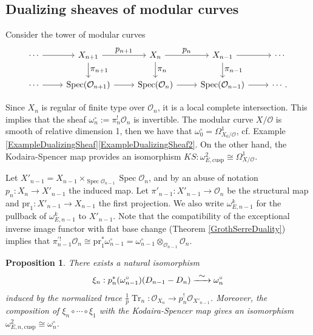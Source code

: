 \documentclass[11pt]{article}
\newcommand{\cf}{cf.\xspace}
\newcommand\To[1]{\mathchoice{\xrightarrow{\textstyle\kern4pt#1\kern3pt}}{\stackrel{#1}{\to}}{}{}}
\let\ts\textstyle
\newcommand{\cusp}{\mathrm{cusp}}
\newcommand{\pr}{\mathrm{pr}}
\numberwithin{equation}{section}
\newtheorem{prop}{Proposition}[section]
\theoremstyle{definition}
\newcommand{\n}[1]{\mathcal{#1}}
\newcommand{\s}[1]{\mathscr{#1}}
\DeclareMathOperator{\Tr}{Tr}
\DeclareMathOperator{\Spec}{Spec}
\begin{document}
\subsection*{Dualizing sheaves of modular curves}

Consider the tower of modular curves
\[
\begin{tikzcd}
\cdots \ar[r] & X_{n+1} \ar[r,"\ts p_{n+1}"] \ar[d, "\ts \pi_{n+1}"]& X_n \ar[r,"\ts p_n"] \ar[d, "\ts \pi_n"]& X_{n-1} \ar[r] \ar[d, "\ts \pi_{n-1}"] & \cdots \\
\cdots \ar[r] & \Spec(\n{O}_{n+1}) \ar[r] & \Spec(\n{O}_{n}) \ar[r] & \Spec(\n{O}_{n-1}) \ar[r] & \cdots.
\end{tikzcd}
\]

Since $X_n$ is regular of finite type over $\n{O}_n$, it is a local complete intersection. This implies that the sheaf $\omega^{\circ}_n:= \pi_{n}^! \n{O}_n$ is invertible.
The modular curve $X/\n{O}$ is smooth of relative dimension 1, then we have that $\omega_{0}^\circ = \Omega_{X_0/\n{O}}^1$, \cf Example \ref{ExampleDualizingSheaf}\eqref{ExampleDualizingSheaf2}. On the other hand, the Kodaira-Spencer map provides an isomorphism $KS:\omega^2_{E,\cusp}\cong \Omega^1_{X/\n{O}}$.

Let $X'_{n-1}= X_{n-1}\times_{\Spec \n{O}_{n-1}}\Spec \n{O}_n$, and by an abuse of notation $p_n: X_{n}\to X'_{n-1}$ the induced map. Let $\pi'_{n-1}: X'_{n-1}\to \n{O}_n$ be the structural map and $\pr_1: X'_{n-1}\to X_{n-1}$ the first projection. We also write $\omega_{E,n-1}^k$ for the pullback of $\omega_{E,n-1}^k$ to $X'_{n-1}$. Note that the compatibility of the exceptional inverse image functor with flat base change (Theorem \ref{GrothSerreDuality}) implies that $\pi^{'!}_{n-1} \n{O}_n\cong \pr_1^{*} \omega_{n-1}^{\circ}= \omega_{n-1}^{\circ}\otimes_{\n{O}_{n-1}}\n{O}_n$.

\begin{prop}
\label{isoDualizingModforms}
There exists a natural isomorphism
\[
\xi_n: p_{n}^*(\omega_{n-1}^{\circ})(D_{n-1}-D_n)\To{\sim} \omega_n^{\circ}
\]
induced by the normalized trace $\frac{1}{p}\Tr_n:\s{O}_{X_n}\to p_n^! \s{O}_{X'_{n-1}}$. Moreover, the composition of $ \xi_n \circ \cdots \circ \xi_1$ with the Kodaira-Spencer map gives an isomorphism $\omega^2_{E,n,\cusp}\cong \omega^{\circ}_n$.
\end{prop}
\end{document}

